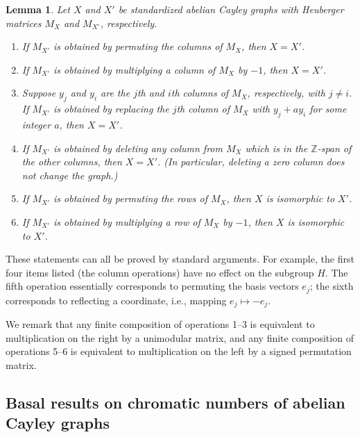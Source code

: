 \documentclass{article}
\newtheorem{Lem}[Thm]{Lemma}
\theoremstyle{definition}
\theoremstyle{remark}
\begin{document}
\begin{Lem}\label{lemma-isomorphisms}
Let $X$ and $X'$ be standardized abelian Cayley graphs with Heuberger matrices $M_X$ and $M_{X'}$, respectively.\begin{enumerate}

\item If $M_{X'}$ is obtained by permuting the columns of $M_X$, then $X=X'$.

\item If $M_{X'}$ is obtained by multiplying a column of $M_X$ by $-1$, then $X=X'$.

\item\label{item-add-multiple of column} Suppose $y_j$ and $y_i$ are the $j$th and $i$th columns of $M_X$, respectively, with $j\neq i$.  If $M_{X'}$ is obtained by replacing the 
$j$th column of $M_X$ with $y_j+ay_i$ for some integer $a$, then $X=X'$.

\item\label{item-delete-column-Z-span} If $M_{X'}$ is obtained by deleting any column from $M_X$ which is in the $\mathbb{Z}$-span of the other columns, then $X=X'$.  (In particular, deleting a zero column does not change the graph.)

\item If $M_{X'}$ is obtained by permuting the rows of $M_X$, then $X$ is isomorphic to $X'$.

\item If $M_{X'}$ is obtained by multiplying a row of $M_X$ by $-1$, then $X$ is isomorphic to $X'$.

\end{enumerate}\end{Lem}

These statements can all be proved by standard arguments.  For example, the first four items listed (the column operations) have no effect on the subgroup $H$.  The fifth operation essentially corresponds to permuting the basis vectors $e_j$; the sixth corresponds to reflecting a coordinate, i.e., mapping $e_j\mapsto -e_j$.

We remark that any finite composition of operations 1--3 is equivalent to multiplication on the right by a unimodular matrix, and any finite composition of operations 5--6 is equivalent to multiplication on the left by a signed permutation matrix.

\subsection{Basal results on chromatic numbers of abelian Cayley graphs}
\end{document}
